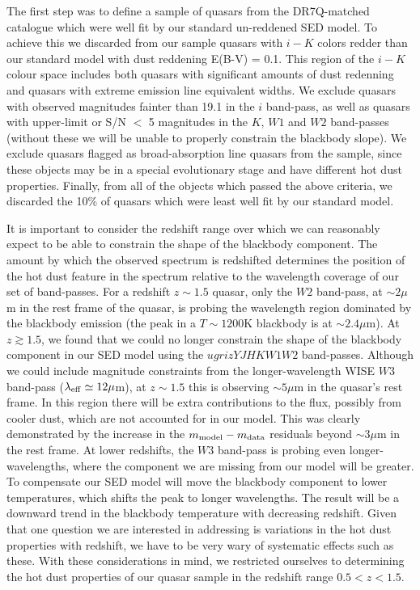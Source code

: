 The first step was to define a sample of quasars from the DR7Q-matched catalogue which were well fit by our standard un-reddened SED model. To achieve this we discarded from our sample quasars with $i - K$ colors redder than our standard model with dust reddening E(B-V) = 0.1. This region of the $i-K$ colour space includes both quasars with significant amounts of dust redenning and quasars with extreme emission line equivalent widths. We exclude quasars with observed magnitudes fainter than 19.1 in the $i$ band-pass, as well as quasars with upper-limit or S/N $<$ 5 magnitudes in the $K$, $W1$ and $W2$ band-passes (without these we will be unable to properly constrain the blackbody slope). We exclude quasars flagged as broad-absorption line quasars \citep[BALQSOs;][]{weymann91} from the sample, since these objects may be in a special evolutionary stage and have different hot dust properties. Finally, from all of the objects which passed the above criteria, we discarded the 10\% of quasars which were least well fit by our standard model.   

It is important to consider the redshift range over which we can reasonably expect to be able to constrain the shape of the blackbody component. The amount by which the observed spectrum is redshifted determines the position of the hot dust feature in the spectrum relative to the wavelength coverage of our set of band-passes. For a redshift $z \sim 1.5$ quasar, only the $W2$ band-pass, at $\sim 2 \mu$m in the rest frame of the quasar, is probing the wavelength region dominated by the blackbody emission (the peak in a $T \sim 1200$K blackbody is at $\sim 2.4 \mu$m). At $z \gtrsim 1.5$, we found that we could no longer constrain the shape of the blackbody component in our SED model using the $ugrizYJHKW1W2$ band-passes. Although we could include magnitude constraints from the longer-wavelength WISE $W3$ band-pass ($\lambda_{\rm eff} \simeq 12 \mu$m), at $z \sim 1.5$ this is observing $\sim 5 \mu$m in the quasar's rest frame. In this region there will be extra contributions to the flux, possibly from cooler dust, which are not accounted for in our model. This was clearly demonstrated by the increase in the $m_{\rm model} - m_{\rm data}$ residuals beyond $\sim 3\mu$m in the rest frame. At lower redshifts, the $W3$ band-pass is probing even longer-wavelengths, where the component we are missing from our model will be greater. To compensate our SED model will move the blackbody component to lower temperatures, which shifts the peak to longer wavelengths. The result will be a downward trend in the blackbody temperature with decreasing redshift. Given that one question we are interested in addressing is variations in the hot dust properties with redshift, we have to be very wary of systematic effects such as these. With these considerations in mind, we restricted ourselves to determining the hot dust properties of our quasar sample in the redshift range $0.5 < z < 1.5$. 

